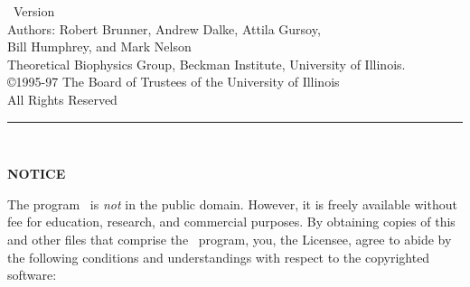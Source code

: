 
\thispagestyle{empty}

\vspace*{0.1in}

\begin{centering}
{\LARGE \NAMD\ Version \NAMDVER}\\
{\large
\bigskip
Authors: Robert Brunner, Andrew Dalke, Attila Gursoy,\\
Bill Humphrey, and Mark Nelson\\
\medskip
Theoretical Biophysics Group, Beckman Institute, University of Illinois.\\
\bigskip
\bigskip
\copyright 1995-97 The Board of Trustees of the University of Illinois\\
All Rights Reserved\\
\bigskip
\bigskip
}
\end{centering}

  \rule{6in}{0.04in}				\\	\vspace{0.25in}

{\bf \LARGE \noindent NOTICE}
\vspace{0.25 in}

\noindent The program \NAMD\ is {\it not\/} in the public domain.
However, it is freely available without fee for
education, research, and commercial purposes.  By obtaining copies
of this and other files that comprise the \NAMD\ program, you, 
the Licensee, agree to abide by the following
conditions and understandings with respect to the copyrighted software:

